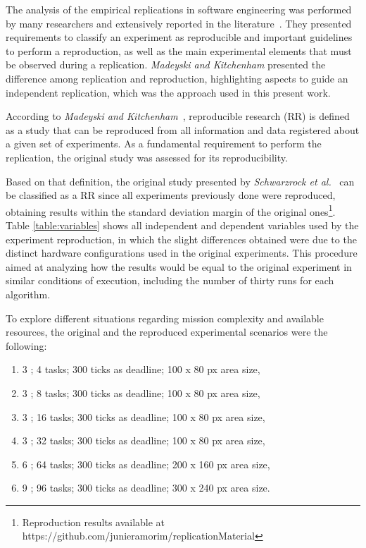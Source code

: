 The analysis of the empirical replications in software engineering was performed by many researchers and extensively reported in the literature~\citep{exp05, exp04, exp03, exp01}. They presented requirements to classify an experiment as reproducible and important guidelines to perform a reproduction, as well as the main experimental elements that must be observed during a replication. \textit{Madeyski and Kitchenham} \citep{exp02} presented the difference among replication and reproduction, highlighting aspects to guide an independent replication, which was the approach used in this present work.

According to \textit{Madeyski and Kitchenham}~\citep{exp02}, reproducible research (RR) is defined as a study that can be reproduced from all information and data registered about a given set of experiments. As a fundamental requirement to perform the replication, the original study was assessed for its reproducibility.

Based on that definition, the original study presented by \textit{Schwarzrock et al.}~\citep{MAS07} can be classified as a RR since all experiments previously done were reproduced, obtaining results within the standard deviation margin of the original ones\footnote{Reproduction results available at https://github.com/junieramorim/replicationMaterial}. Table \ref{table:variables} shows all independent and dependent variables used by the experiment reproduction, in which the slight differences obtained were due to the distinct hardware configurations used in the original experiments. This procedure aimed at analyzing how the results would be equal to the original experiment in similar conditions of execution, including the number of thirty runs for each algorithm.

To explore different situations regarding mission complexity and available resources, the original and the reproduced experimental scenarios were the following:

\begin{enumerate}
	\item 3 \uavs; 4 tasks; 300 ticks as deadline; 100 x 80 px area size, \label{case:4tasks}
	\item 3 \uavs; 8 tasks; 300 ticks as deadline; 100 x 80 px area size, \label{case:8tasks}
	\item 3 \uavs; 16 tasks; 300 ticks as deadline; 100 x 80 px area size, \label{case:16tasks}
	\item 3 \uavs; 32 tasks; 300 ticks as deadline; 100 x 80 px area size, \label{case:32tasks}
	\item 6 \uavs; 64 tasks; 300 ticks as deadline; 200 x 160 px area size, \label{case:64tasks}
	\item 9 \uavs; 96 tasks; 300 ticks as deadline; 300 x 240 px area size. \label{case:96tasks}
\end{enumerate}

